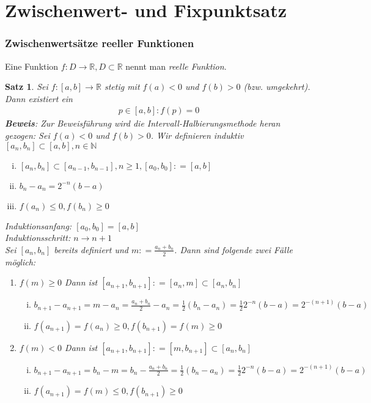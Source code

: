 \documentclass[ngerman,titlepage,twoside, parskip=half*]{scrreprt}
\newcommand*{\N}{\mathbb{N}}
\newcommand*{\R}{\mathbb{R}}
\theoremstyle{plain}
\newtheorem{theorem}{Satz}[section]
\theoremstyle{definition}
\theoremstyle{remark}
\newcommand*{\coloneqq}{\mathrel{\mathop:}=}
\begin{document}
\section{Zwischenwert- und Fixpunktsatz}
\subsubsection{Zwischenwertsätze reeller Funktionen}
Eine Funktion $f\colon D\rightarrow\R , D\subset \R$ nennt man \emph{reelle Funktion}.
\begin{theorem}
\label{satz:zws}
Sei $f\colon[a,b]\rightarrow \R$ stetig mit $f(a)<0$ und $f(b)>0$ (bzw. umgekehrt). Dann existiert ein
\begin{gather*}p\in[a,b]\colon f(p)=0\end{gather*}
\textbf{Beweis}: Zur Beweisführung wird die Intervall-Halbierungsmethode heran gezogen:
Sei $f(a)<0$ und $f(b)>0$. Wir definieren induktiv $[a_n,b_n]\subset [a,b], n\in \N$
\begin{enumerate}[(i)]
  \item $[a_n,b_n]\subset [a_{n-1},b_{n-1}], n\geq 1, [a_0,b_0]\coloneqq[a,b]$
  \item $b_n-a_n=2^{-n}(b-a)$
  \item $f(a_n)\leq 0, f(b_n)\geq 0$
\end{enumerate}
Induktionsanfang: $[a_0,b_0]=[a,b]$\\
Induktionsschritt: $n\rightarrow n+1$\\
Sei $[a_n,b_n]$ bereits definiert und $m\coloneqq\frac{a_n+b_n}{2}$. Dann sind folgende zwei Fälle möglich:
\begin{enumerate}[1. F{a}ll]
  \item $f(m)\geq 0$ Dann ist $[a_{n+1},b_{n+1}]\coloneqq[a_n,m]\subset [a_n,b_n]$
    \begin{enumerate}[(i)]
      \item $b_{n+1}-a_{n+1}=m-a_n=\frac{a_n+b_n}{2}-a_n=\frac{1}{2}(b_n-a_n)=\frac{1}{2}2^{-n}(b-a)=2^{-(n+1)}(b-a)$
      \item $f(a_{n+1})=f(a_n)\geq 0, f(b_{n+1})=f(m)\geq 0$
    \end{enumerate}
  \item $f(m)<0$ Dann ist $[a_{n+1},b_{n+1}]\coloneqq[m,b_{n+1}]\subset [a_n,b_n]$
    \begin{enumerate}[(i)]
      \item $b_{n+1}-a_{n+1}=b_n-m=b_n-\frac{a_n+b_n}{2}=\frac{1}{2}(b_n-a_n)=\frac{1}{2}2^{-n}(b-a)=2^{-(n+1)}(b-a)$
      \item $f(a_{n+1})=f(m)\leq 0, f(b_{n+1})\geq 0$

\end{enumerate}
\end{enumerate}
\end{theorem}
\end{document}
